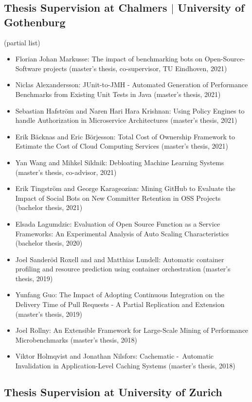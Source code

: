 \documentclass[paper=letter,fontsize=11pt]{scrartcl} %
\begin{document}
\subsection*{Thesis Supervision at Chalmers $|$ University of Gothenburg}

(partial list)

\begin{itemize}
  \item Florian Johan Markusse: The impact of benchmarking bots on Open-Source-Software projects (master's thesis, co-supervisor, TU Eindhoven, 2021)
  \item Niclas Alexandersson: JUnit-to-JMH - Automated Generation of Performance Benchmarks from Existing Unit Tests in Java (master's thesis, 2021)
  \item Sebastian Hafström and Naren Hari Hara Krishnan: Using Policy Engines to handle
  Authorization in Microservice Architectures (master's thesis, 2021)
  \item Erik Bäcknas and  Eric Börjesson: Total Cost of Ownership Framework to Estimate the Cost of Cloud Computing Services (master's thesis, 2021)  
  \item Yan Wang and Mihkel Sildnik: Debloating Machine Learning Systems (master's thesis, co-advisor, 2021)
  \item Erik Tingström and George Karageozian: Mining GitHub to Evaluate the Impact of
  Social Bots on New Committer Retention in OSS Projects (bachelor thesis, 2021)  
	\item Elsada Lagumdzic: Evaluation of Open Source Function as a Service Frameworks: An Experimental Analysis of Auto Scaling Characteristics (bachelor thesis, 2020)
	\item Joel Sanderöd Roxell and and Matthias Lundell: Automatic container profiling
and resource prediction using container orchestration (master's thesis, 2019)
	\item Yunfang Guo: The Impact of Adopting Continuous Integration on the Delivery Time of Pull Requests - A Partial Replication and Extension (master's thesis, 2019)
	\item Joel Rollny: An Extensible Framework for Large-Scale Mining of Performance Microbenchmarks (master's thesis, 2018)
  \item Viktor Holmqvist and Jonathan Nilsfors: Cachematic - Automatic Invalidation in Application-Level Caching Systems (master's thesis, 2018)
\end{itemize}

\subsection*{Thesis Supervision at University of Zurich}
\end{document}
